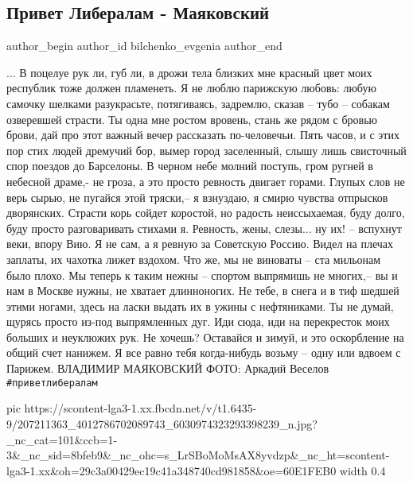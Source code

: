 
 
 
 
 
 
\subsection{Привет Либералам - Маяковский}
\label{sec:26_06_2021.fb.bilchenko_evgenia.2.majakovskij}
\ifcmt
 author_begin
   author_id bilchenko_evgenia
 author_end
\fi

... В поцелуе рук ли,
губ ли,
в дрожи тела
близких мне
красный
цвет
моих республик
тоже
должен
пламенеть.
Я не люблю
парижскую любовь:
любую самочку
шелками разукрасьте,
потягиваясь, задремлю,
сказав –
тубо –
собакам
озверевшей страсти.
Ты одна мне
ростом вровень,
стань же рядом
с бровью брови,
дай
про этот
важный вечер
рассказать
по-человечьи.
Пять часов,
и с этих пор
стих
людей
дремучий бор,
вымер
город заселенный,
слышу лишь
свисточный спор
поездов до Барселоны.
В черном небе
молний поступь,
гром
ругней
в небесной драме,-
не гроза,
а это
просто
ревность двигает горами.
Глупых слов
не верь сырью,
не пугайся
этой тряски,–
я взнуздаю,
я смирю
чувства
отпрысков дворянских.
Страсти корь
сойдет коростой,
но радость
неиссыхаемая,
буду долго,
буду просто
разговаривать стихами я.
Ревность,
жены,
слезы...
ну их! –
вспухнут веки,
впору Вию.
Я не сам,
а я
ревную
за Советскую Россию.
Видел
на плечах заплаты,
их
чахотка
лижет вздохом.
Что же,
мы не виноваты –
ста мильонам
было плохо.
Мы
теперь
к таким нежны –
спортом
выпрямишь не многих,–
вы и нам
в Москве нужны,
не хватает
длинноногих.
Не тебе,
в снега
и в тиф
шедшей
этими ногами,
здесь
на ласки
выдать их
в ужины
с нефтяниками.
Ты не думай,
щурясь просто
из-под выпрямленных дуг.
Иди сюда,
иди на перекресток
моих больших
и неуклюжих рук.
Не хочешь?
Оставайся и зимуй,
и это
оскорбление
на общий счет нанижем.
Я все равно
тебя
когда-нибудь возьму –
одну
или вдвоем с Парижем.
ВЛАДИМИР МАЯКОВСКИЙ
ФОТО: Аркадий Веселов 
\verb|#приветлибералам|

\ifcmt
  pic https://scontent-lga3-1.xx.fbcdn.net/v/t1.6435-9/207211363_4012786702089743_6030974323293398239_n.jpg?_nc_cat=101&ccb=1-3&_nc_sid=8bfeb9&_nc_ohc=s_LrSBoMoMsAX8yvdzp&_nc_ht=scontent-lga3-1.xx&oh=29c3a00429ec19c41a348740cd981858&oe=60E1FEB0
  width 0.4
\fi
